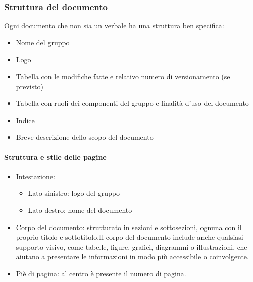 \documentclass[12pt]{article}
\begin{document}
\subsubsection{Struttura del documento}
Ogni documento che non sia un verbale ha una struttura ben specifica:
\begin{itemize}
    \item Nome del gruppo
    \item Logo
    \item Tabella con le modifiche fatte e relativo numero di versionamento (se previsto)
    \item Tabella con ruoli dei componenti del gruppo e finalità d'uso del documento
    \item Indice
    \item Breve descrizione dello scopo del documento
\end{itemize}

\paragraph{Struttura e stile delle pagine}
\begin{itemize}
    \item Intestazione:
          \begin{itemize}
              \item Lato sinistro: logo del gruppo
              \item Lato destro: nome del documento
          \end{itemize}
    \item Corpo del documento:  strutturato in sezioni e sottosezioni, ognuna con il proprio titolo e sottotitolo.Il corpo del documento include anche qualsiasi supporto visivo, come tabelle, figure, grafici, 	diagrammi o illustrazioni, che aiutano a presentare le informazioni in modo più accessibile o coinvolgente.
    \item Piè di pagina: al centro è presente il numero di pagina.
\end{itemize}
\end{document}

